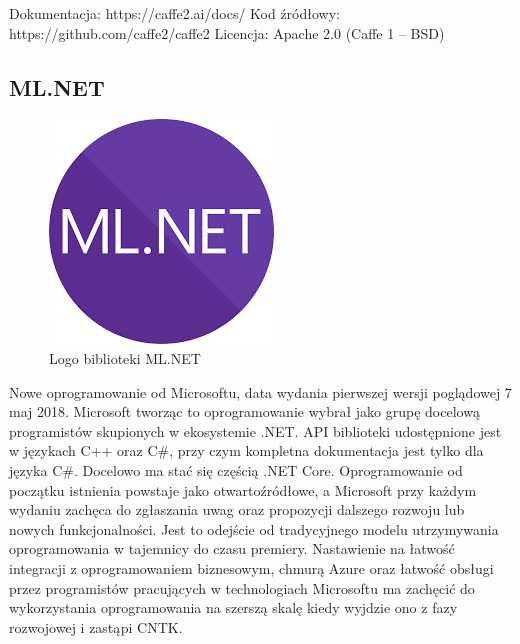 \documentclass[12pt,a4paper,twoside,titlepage,openright]{book}
\begin{document}
\noindent
\newline
Dokumentacja: https://caffe2.ai/docs/
\newline
Kod źródłowy: https://github.com/caffe2/caffe2
\newline
Licencja: Apache 2.0 (Caffe 1 -- BSD)


\subsection{ML.NET}
\begin{figure}[h]
	\centering
			\includegraphics[resolution=100, scale=1]{ML_NET.png}
		\caption{Logo biblioteki ML.NET}
\end{figure}
Nowe oprogramowanie od Microsoftu, data wydania pierwszej wersji poglądowej 7 maj 2018. Microsoft tworząc to oprogramowanie wybrał jako grupę docelową programistów skupionych w ekosystemie .NET. API biblioteki udostępnione jest w językach C++ oraz C#, przy czym kompletna dokumentacja jest tylko dla języka C#. Docelowo ma stać się częścią .NET Core. Oprogramowanie od początku istnienia powstaje jako otwartoźródłowe, a Microsoft przy każdym wydaniu zachęca do zgłaszania uwag oraz propozycji dalszego rozwoju lub nowych funkcjonalności. Jest to odejście od tradycyjnego modelu utrzymywania oprogramowania w tajemnicy do czasu premiery. Nastawienie na łatwość integracji z oprogramowaniem biznesowym, chmurą Azure oraz łatwość obsługi przez programistów pracujących w technologiach Microsoftu ma zachęcić do wykorzystania oprogramowania na szerszą skalę kiedy wyjdzie ono z fazy rozwojowej i zastąpi CNTK.
\end{document}
